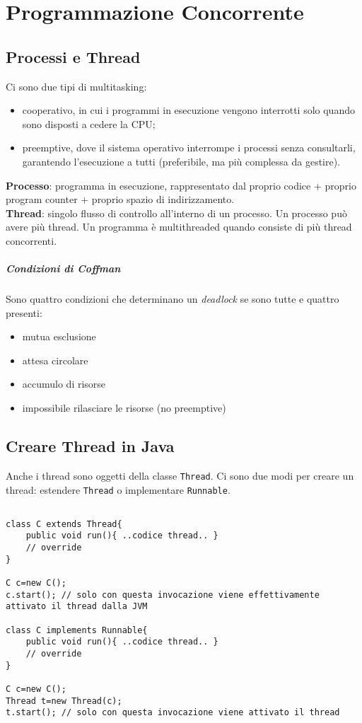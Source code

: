 \chapter{Programmazione Concorrente}

\section{Processi e Thread}
Ci sono due tipi di multitasking: 
\begin{itemize}
\item cooperativo, in cui i programmi in esecuzione vengono interrotti solo quando sono disposti a cedere la CPU;
\item preemptive, dove il sistema operativo interrompe i processi senza consultarli, garantendo l'esecuzione a tutti (preferibile, ma più complessa da gestire).
\end{itemize}
\textbf{Processo}: programma in esecuzione, rappresentato dal proprio codice + proprio program counter + proprio spazio di indirizzamento. \\
\textbf{Thread}: singolo flusso di controllo all'interno di un processo. Un processo può avere più thread. 
Un programma è multithreaded quando consiste di più thread concorrenti.

\paragraph{Condizioni di Coffman}
Sono quattro condizioni che determinano un \textit{deadlock} se sono tutte e quattro presenti:
\begin{itemize}
\item mutua esclusione
\item attesa circolare
\item accumulo di risorse
\item impossibile rilasciare le risorse (no preemptive)
\end{itemize}

\section{Creare Thread in Java}
Anche i thread sono oggetti della classe \texttt{Thread}. Ci sono due modi per creare un thread: estendere \texttt{Thread} o implementare \texttt{Runnable}.
\begin{lstlisting}

class C extends Thread{
    public void run(){ ..codice thread.. }
    // override
}

C c=new C();
c.start(); // solo con questa invocazione viene effettivamente attivato il thread dalla JVM
	
class C implements Runnable{
    public void run(){ ..codice thread.. }
    // override
}

C c=new C();
Thread t=new Thread(c);
t.start(); // solo con questa invocazione viene attivato il thread 

\end{lstlisting}
